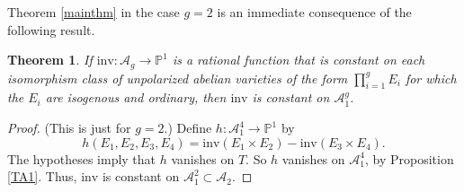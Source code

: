 \documentclass{amsart}
\def\P{\mathbb{P}}
\def\AA{{\mathcal A}}
\def\invar{\mathrm{inv}}
\numberwithin{equation}{section}
\newtheorem{thm}{Theorem}[section]
\theoremstyle{definition}
\begin{document}
Theorem \ref{mainthm} in the case $g=2$ is an immediate consequence of the following result.

\begin{thm}
\label{mainthmT}
If $\invar : \AA_g \to \P^1$ is a rational function that is constant on each isomorphism class of unpolarized abelian varieties of the form $\prod_{i=1}^g E_i$ for which the $E_i$ are isogenous and ordinary, then $\invar$ is constant on $\AA_1^g$.
\end{thm}

\begin{proof}
(This is just for $g=2$.)
Define $h : \AA_1^4 \to \P^1$ by
$$
h(E_1,E_2,E_3,E_4) = \invar(E_1\times E_2)-\invar(E_3\times E_4).
$$
The hypotheses imply that $h$ vanishes on $T$. So $h$ vanishes on $\AA_1^4$, by Proposition \ref{TA1}. Thus, $\invar$ is constant on $\AA_1^2 \subset \AA_2$.
\end{proof}




\end{document}
